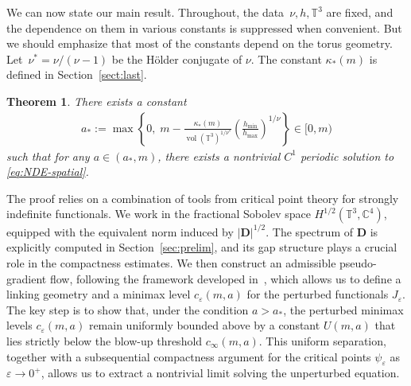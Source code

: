 \documentclass[11pt,final]{amsart}
\newcommand{\T}{\mathbb{T}}
\newcommand{\eps}{\varepsilon}
\newcommand{\pD}{\mathbf{D}}
\newtheorem{thm}{Theorem}[section]
\begin{document}
We can now state our main result.
Throughout, the data~$\nu,h,\mathbb{T}^3$ are fixed, and the dependence on them in various constants is suppressed when convenient.
But we should emphasize that most of the constants depend on the torus geometry.  
Let~$\nu^*=\nu/(\nu-1)$ be the H\"older conjugate of $\nu$. 
The constant $\kappa_*(m)$ is defined in Section~\ref{sect:last}.
\begin{thm}\label{thm:main}
There exists a constant
\begin{align}
a_*:=\max\left\{0,\; m-\frac{\kappa_*(m)}{\operatorname{vol}(\mathbb{T}^3)^{1/\nu^*}}
  \left(\frac{h_{\min}}{h_{\max}}\right)^{1/\nu}\right\} \in [0,m)
\end{align}
such that for any $a\in(a_*,m)$, there exists a nontrivial $C^1$ periodic solution to \eqref{eq:NDE-spatial}.
\end{thm}


The proof relies on a combination of tools from critical point theory for strongly indefinite functionals. We work in the fractional Sobolev space $H^{1/2}(\T^3,\mathbb{C}^4)$, equipped with the equivalent norm induced by $|\pD|^{1/2}$. The spectrum of $\pD$ is explicitly computed in Section~\ref{sec:prelim}, and its gap structure plays a crucial role in the compactness estimates. We then construct an admissible pseudo-gradient flow, following the framework developed in~\cite{WZ2026Stationary}, which allows us to define a linking geometry and a minimax level $c_\eps(m,a)$ for the perturbed functionals $J_\eps$. The key step is to show that, under the condition $a>a_*$, the perturbed minimax levels $c_\eps(m,a)$ remain uniformly bounded above by a constant $U(m,a)$ that lies strictly below the blow-up threshold $c_\infty(m,a)$. This uniform separation, together with a subsequential compactness argument for the critical points $\psi_\eps$ as $\eps\to0^+$, allows us to extract a nontrivial limit solving the unperturbed equation.
\end{document}
